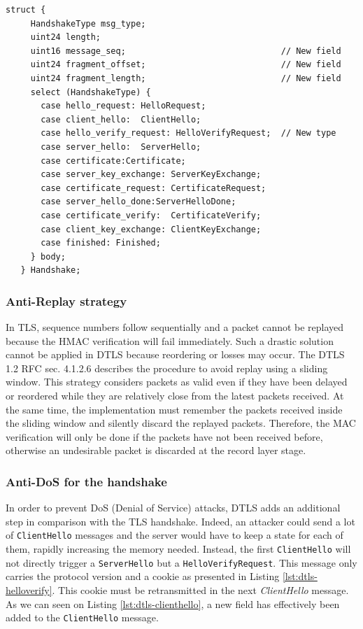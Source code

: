 \begin{lstlisting}[caption=DTLS handshake message, label=lst:dtls-handshake]
   struct {
     HandshakeType msg_type;
     uint24 length;
     uint16 message_seq;                               // New field
     uint24 fragment_offset;                           // New field
     uint24 fragment_length;                           // New field
     select (HandshakeType) {
       case hello_request: HelloRequest;
       case client_hello:  ClientHello;
       case hello_verify_request: HelloVerifyRequest;  // New type
       case server_hello:  ServerHello;
       case certificate:Certificate;
       case server_key_exchange: ServerKeyExchange;
       case certificate_request: CertificateRequest;
       case server_hello_done:ServerHelloDone;
       case certificate_verify:  CertificateVerify;
       case client_key_exchange: ClientKeyExchange;
       case finished: Finished;
     } body;
   } Handshake;
\end{lstlisting}

\subsubsection{Anti-Replay strategy}

In TLS, sequence numbers follow sequentially and a packet cannot be replayed because the HMAC verification will fail immediately. Such a drastic solution cannot be applied in DTLS because reordering or losses may occur. The DTLS 1.2 RFC \cite{rfc6347} sec. 4.1.2.6 describes the procedure to avoid replay using a sliding window. This strategy considers packets as valid even if they have been delayed or reordered while they are relatively close from the latest packets received. At the same time, the implementation must remember the packets received inside the sliding window and silently discard the replayed packets. Therefore, the MAC verification will only be done if the packets have not been received before, otherwise an undesirable packet is discarded at the record layer stage.

\subsubsection{Anti-DoS for the handshake}

In order to prevent DoS (Denial of Service) attacks, DTLS adds an additional step in comparison with the TLS handshake. Indeed, an attacker could send a lot of \texttt{ClientHello} messages and the server would have to keep a state for each of them, rapidly increasing the memory needed. Instead, the first \texttt{ClientHello} will not directly trigger a \texttt{ServerHello} but a \texttt{HelloVerifyRequest}. This message only carries the protocol version and a cookie as presented in Listing \ref{lst:dtls-helloverify}. This cookie must be retransmitted in the next \textit{ClientHello} message. As we can seen on Listing \ref{lst:dtls-clienthello}, a new field has effectively been added to the \texttt{ClientHello} message.

